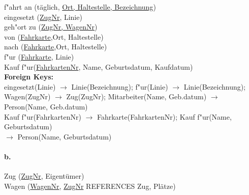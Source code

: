 \documentclass[12pt]{article}
\newcommand{\arrowright}{$\longrightarrow$ }
\begin{document}
	 	f"ahrt an (täglich, \underline{Ort, Haltestelle, Bezeichnung})\\[1.2em]
	 	
	 	eingesetzt (\underline{ZugNr}, Linie)\\[1.2em]
	 	
	 	geh"ort zu (\underline{ZugNr, WagenNr})\\[1.2em]
	 	
	 	von (\underline{Fahrkarte},Ort, Haltestelle)\\[1.2em]
	 	
	 	nach (\underline{Fahrkarte},Ort, Haltestelle)\\[1.2em]
	 	
	 	f"ur (\underline{Fahrkarte}, Linie)\\[1.2em]
	 	
	 	Kauf f"ur(\underline{FahrkartenNr}, Name, Geburtsdatum, Kaufdatum)\\[2 em]
	 	\textbf{Foreign Keys:}\\
	 	
	 	eingesetzt(Linie) \arrowright Linie(Bezeichnung); f"ur(Linie) \arrowright Linie(Bezeichnung);\\[1.1em]
	 	
	 	Wagen(ZugNr) \arrowright Zug(ZugNr); Mitarbeiter(Name, Geb.datum) \arrowright Person(Name, Geb.datum)\\[1.1em]
	 	
	 	Kauf f"ur(FahrkartenNr) \arrowright Fahrkarte(FahrkartenNr); Kauf f"ur(Name, Geburtsdatum)\\ \arrowright Person(Name, Geburtsdatum)\\[1.1em]
	 	
	 	
	 	
	 	
 	
 	\paragraph*{b.}	
 	
 	Zug (\underline{ZugNr}, Eigentümer)\\[1.3em]
 	
 	Wagen (\underline{WagenNr}, \underline{ZugNr} REFERENCES Zug, Plätze)\\[1.3em]
 	
\end{document}

